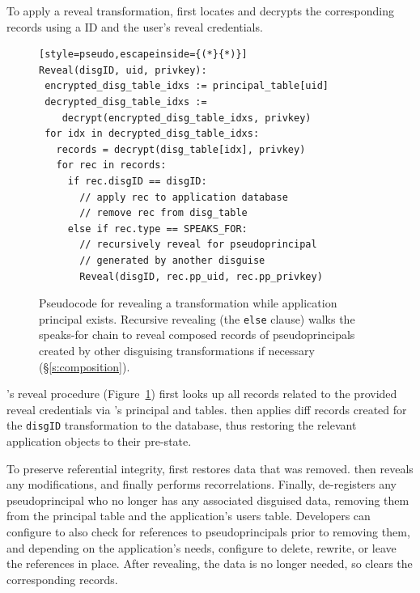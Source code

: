 %
To apply a reveal transformation, \sys first locates and decrypts the
corresponding \xx records using a \xx ID and the user’s reveal
credentials.
%

\begin{figure}[t]
  \small
\begin{lstlisting}[style=pseudo,escapeinside={(*}{*)}]
Reveal(disgID, uid, privkey):
 encrypted_disg_table_idxs := principal_table[uid]
 decrypted_disg_table_idxs :=
    decrypt(encrypted_disg_table_idxs, privkey)
 for idx in decrypted_disg_table_idxs:
   records = decrypt(disg_table[idx], privkey)
   for rec in records:
     if rec.disgID == disgID:
       // apply rec to application database
       // remove rec from disg_table
     else if rec.type == SPEAKS_FOR:
       // recursively reveal for pseudoprincipal
       // generated by another disguise
       Reveal(disgID, rec.pp_uid, rec.pp_privkey)
\end{lstlisting}
    \caption{Pseudocode for revealing a \xxing transformation while
    application principal  exists. Recursive revealing (the
    \texttt{\small else} clause) walks the speaks-for chain to reveal composed
    records of pseudoprincipals created by other disguising transformations
    if necessary (\S\ref{s:composition}).}
  \label{f:revealpseudo}
\end{figure}

\sys's reveal procedure (Figure~\ref{f:revealpseudo}) first looks up all \xx
records related to the provided reveal credentials via \sys's principal and \xx
tables.
%
\sys then applies diff records created for the \verb+disgID+ \xx transformation
to the database, thus restoring the relevant
application objects to their pre-\xxed state.

%
To preserve referential integrity, \sys first restores \xxed data that was
removed.
%
\sys then reveals any modifications, and finally performs recorrelations. 
%
Finally, \sys de-registers any pseudoprincipal who no longer has any associated
disguised data, removing them from the principal table and the application's
users table.
%
Developers can configure \sys to also check for references to pseudoprincipals
prior to removing them, and depending on the application's needs, configure \sys
to delete, rewrite, or leave the references in place.
%
After revealing, the \xxed data is no longer needed, so \sys clears the
corresponding \xx records.
%

